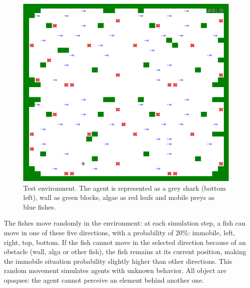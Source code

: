 \documentclass[conference]{IEEEtran}
\begin{document}
\begin{figure}[htbp]
\centerline{\includegraphics[scale=0.4]{img/environment.png}}
\caption{Test environment. The agent is represented as a grey shark (bottom left), wall as green blocks, algae as red leafs and mobile preys as blue fishes.}
\label{fig}
\end{figure}

The fishes move randomly in the environment: at each simulation step, a fish can move in one of these five directions, with a probability of 20\%: immobile, left, right, top, bottom. If the fish cannot move in the selected direction because of an obstacle (wall, alga or other fish), the fish remains at its current position, making the immobile situation probability slightly higher than other directions. This random movement simulates agents with unknown behavior. All object are opaques: the agent cannot perceive an element behind another one.
\end{document}
